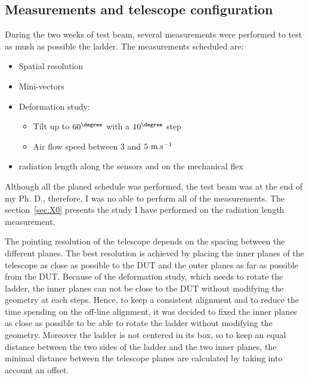 
    \subsection{Measurements and telescope configuration}

    During the two weeks of test beam, several measurements were performed to test as mush as possible the ladder.
    The measurements scheduled are: 
    \begin{itemize}
      \item Spatial resolution
      \item Mini-vectors
      \item Deformation study:
      \begin{itemize}
        \item Tilt up to $60^{\degree}$ with a $10^{\degree}$ step
        \item Air flow speed between 3 and $5~\rm{m.s}^{-1}$
      \end{itemize}
      \item radiation length along the sensors and on the mechanical flex
    \end{itemize}

    Although all the planed schedule was performed, the test beam was at the end of my Ph. D., therefore, I was no able to perform all of the measurements.
    The section~\ref{sec:X0} presents the study I have performed on the radiation length measurement.

    The pointing resolution of the telescope depends on the spacing between the different planes. 
    The best resolution is achieved by placing the inner planes of the telescope as close as possible to the \gls{DUT} and the outer planes as far as possible from the \gls{DUT}.
    Because of the deformation study, which needs to rotate the ladder, the inner planes can not be close to the \gls{DUT} without modifying the geometry at each steps.
    Hence, to keep a consistent alignment and to reduce the time spending on the off-line alignment, it was decided to fixed the inner planes as close as possible to be able to rotate the ladder without modifying the geometry.
    Moreover the ladder is not centered in its box, so to keep an equal distance between the two sides of the ladder and the two inner planes, the minimal distance between the telescope planes are calculated by taking into account an offset.

